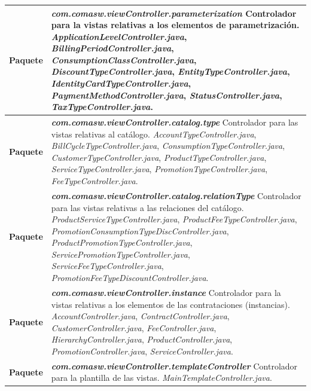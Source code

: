 \begin{longtable}{m{1cm} m{11cm}}
\textbf{Paquete} & \textit{\textbf{com.comasw.viewController.parameterization}} \newline
     Controlador para la vistas relativas a los elementos de parametrización.\newline
\textit{ApplicationLevelController.java},
\textit{BillingPeriodController.java},
\textit{ConsumptionClassController.java},
\textit{DiscountTypeController.java},
\textit{EntityTypeController.java},
\textit{IdentityCardTypeController.java},
\textit{PaymentMethodController.java},
\textit{StatusController.java},
\textit{TaxTypeController.java}.
	\\\hline
\textbf{Paquete} & \textit{\textbf{com.comasw.viewController.catalog.type}} \newline
     Controlador para las vistas relativas al catálogo.\newline
\textit{AccountTypeController.java},
\textit{BillCycleTypeController.java},
\textit{ConsumptionTypeController.java},
\textit{CustomerTypeController.java},
\textit{ProductTypeController.java},
\textit{ServiceTypeController.java},
\textit{PromotionTypeController.java},
\textit{FeeTypeController.java}.
	\\\hline

	\textbf{Paquete} & \textit{\textbf{com.comasw.viewController.catalog.relationType}} \newline
     Controlador para las vistas relativas a las relaciones del catálogo.\newline
\textit{ProductServiceTypeController.java},
\textit{ProductFeeTypeController.java},
\textit{PromotionConsumptionTypeDiscController.java},
\textit{ProductPromotionTypeController.java},
\textit{ServicePromotionTypeController.java},
\textit{ServiceFeeTypeController.java},
\textit{PromotionFeeTypeDiscountController.java}.
	\\\hline


\textbf{Paquete} & \textit{\textbf{com.comasw.viewController.instance}} \newline
     Controlador para la vistas relativas a los elementos de las contrataciones (instancias).\newline
\textit{AccountController.java},
\textit{ContractController.java},
\textit{CustomerController.java},
\textit{FeeController.java},
\textit{HierarchyController.java},
\textit{ProductController.java},
\textit{PromotionController.java},
\textit{ServiceController.java}.
	\\\hline


	\textbf{Paquete} & \textit{\textbf{com.comasw.viewController.templateController}} \newline
     Controlador para la plantilla de las vistas.\newline
\textit{MainTemplateController.java}.
	\\\hline



\end{longtable}
